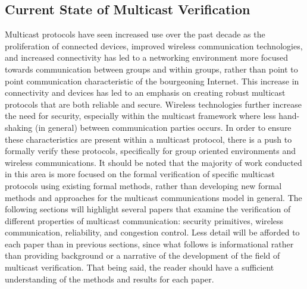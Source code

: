 \documentclass[12pt, fullpage]{article}
\begin{document}
\subsection{Current State of Multicast Verification}
Multicast protocols have seen increased use over the past decade as the proliferation of connected devices, improved wireless communication technologies, and increased connectivity has led to a networking environment more focused towards communication between groups and within groups, rather than point to point communication characteristic of the bourgeoning Internet. This increase in connectivity and devices has led to an emphasis on creating robust multicast protocols that are both reliable and secure. Wireless technologies further increase the need for security, especially within the multicast framework where less hand-shaking (in general) between communication parties occurs. In order to ensure these characteristics are present within a multicast protocol, there is a push to formally verify these protocols, specifically for group oriented environments and wireless communications. It should be noted that the majority of work conducted in this area is more focused on the formal verification of specific multicast protocols using existing formal methods, rather than developing new formal methods and approaches for the multicast communications model in general.
\bigbreak
The following sections will highlight several papers that examine the verification of different properties of multicast communication: security primitives, wireless communication, reliability, and congestion control. Less detail will be afforded to each paper than in previous sections, since what follows is informational rather than providing background or a narrative of the development of the field of multicast verification. That being said, the reader should have a sufficient understanding of the methods and results for each paper.
\bigbreak
\end{document}
